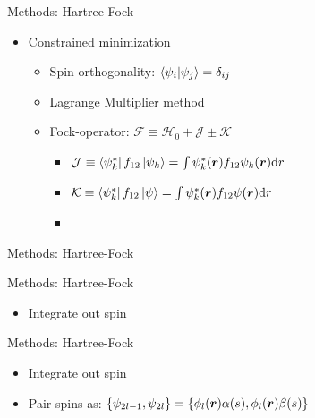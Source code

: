 \documentclass[10pt, t, xcolor=dvipsnames]{beamer}
\begin{document}
{{\begin{frame}[fragile]{Methods: Hartree-Fock}
    \begin{itemize}
        \item Constrained minimization
            \begin{itemize}
                \item Spin orthogonality: $\braket{\psi_i}{\psi_j} =
                    \delta_{ij}$
                \item Lagrange Multiplier method
                \item Fock-operator: $\mathcal{F} \equiv \mathcal{H}_0 + \mathcal{J} \pm \mathcal{K}$
                    \begin{itemize}
                        \item $\mathcal{J} \equiv
                            \bra{\psi^{*}_k}f_{12}\ket{\psi_k} = \int
                            \psi^{*}_k(\bm{{r}})f_{12}\psi_k(\bm{{r}})\mathrm{d} r$
                        \vsp
                        \item $\mathcal{K} \equiv
                            \bra{\psi^{*}_k}f_{12}\ket{\psi} = \int
                            \psi^{*}_k(\bm{{r}})f_{12}\psi(\bm{{r}})\mathrm{d} r$
                        \vsp
                        \item {}
                    \end{itemize}
            \end{itemize}
    \end{itemize}
\end{frame}

\begin{frame}[fragile]{Methods: Hartree-Fock}
\end{frame}

\begin{frame}[fragile]{Methods: Hartree-Fock}
    \begin{itemize}
        \item Integrate out spin
    \end{itemize}
\end{frame}

\begin{frame}[fragile]{Methods: Hartree-Fock}
    \begin{itemize}
        \item Integrate out spin
        \item Pair spins as: $\{\psi_{2l-1}, \psi_{2l}\} =
            \{\phi_l(\bm{{r}})\alpha(s),\phi_l(\bm{{r}})\beta(s)\}$
    \end{itemize}
\end{frame}

}}
\end{document}
